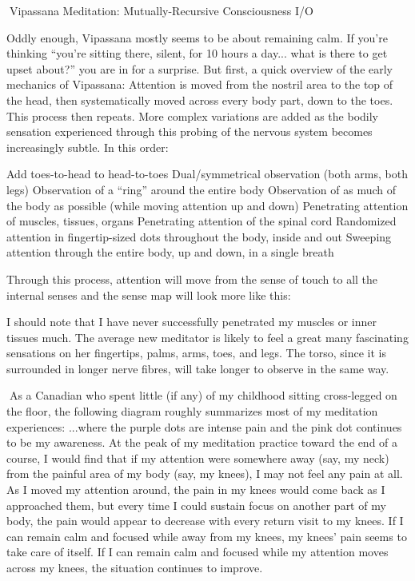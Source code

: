 \documentclass{article}
\begin{document}
Vipassana Meditation:
Mutually-Recursive
Consciousness I/O


Oddly enough, Vipassana mostly seems to be about remaining calm. If you're thinking ``you're sitting there, silent, for 10 hours a day... what is there to get upset about?'' you are in for a surprise. But first, a quick overview of the early mechanics of Vipassana:
Attention is moved from the nostril area to the top of the head, then systematically moved across every body part, down to the toes. This process then repeats. More complex variations are added as the bodily sensation experienced through this probing of the nervous system becomes increasingly subtle. In this order:

Add toes-to-head to head-to-toes
Dual/symmetrical observation (both arms, both legs)
Observation of a ``ring'' around the entire body
Observation of as much of the body as possible (while moving attention up and down)
Penetrating attention of muscles, tissues, organs
Penetrating attention of the spinal cord
Randomized attention in fingertip-sized dots throughout the body, inside and out
Sweeping attention through the entire body, up and down, in a single breath

Through this process, attention will move from the sense of touch to all the internal senses and the sense map will look more like this:

I should note that I have never successfully penetrated my muscles or inner tissues much. The average new meditator is likely to feel a great many fascinating sensations on her fingertips, palms, arms, toes, and legs. The torso, since it is surrounded in longer nerve fibres, will take longer to observe in the same way.

As a Canadian who spent little (if any) of my childhood sitting cross-legged on the floor, the following diagram roughly summarizes most of my meditation experiences:
...where the purple dots are intense pain and the pink dot continues to be my awareness. At the peak of my meditation practice toward the end of a course, I would find that if my attention were somewhere away (say, my neck) from the painful area of my body (say, my knees), I may not feel any pain at all. As I moved my attention around, the pain in my knees would come back as I approached them, but every time I could sustain focus on another part of my body, the pain would appear to decrease with every return visit to my knees. If I can remain calm and focused while away from my knees, my knees' pain seems to take care of itself. If I can remain calm and focused while my attention moves across my knees, the situation continues to improve.
\end{document}

